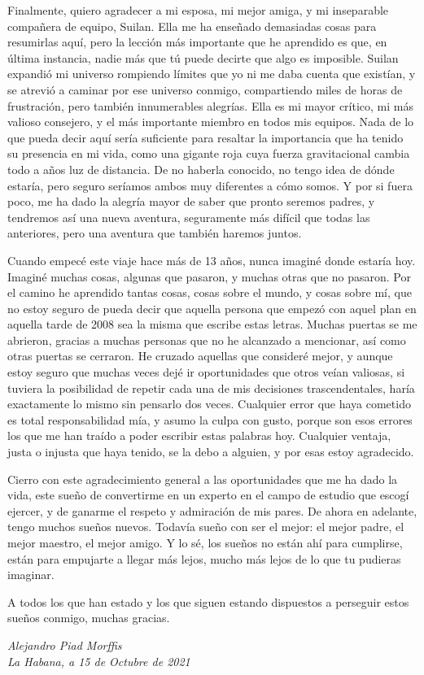 Finalmente, quiero agradecer a mi esposa, mi mejor amiga, y mi inseparable compañera de equipo, Suilan.
Ella me ha enseñado demasiadas cosas para resumirlas aquí, pero la lección más importante que he aprendido es que, en última instancia, nadie más que tú puede decirte que algo es imposible.
Suilan expandió mi universo rompiendo límites que yo ni me daba cuenta que existían, y se atrevió a caminar por ese universo conmigo, compartiendo miles de horas de frustración, pero también innumerables alegrías.
Ella es mi mayor crítico, mi más valioso consejero, y el más importante miembro en todos mis equipos.
Nada de lo que pueda decir aquí sería suficiente para resaltar la importancia que ha tenido su presencia en mi vida, como una gigante roja cuya fuerza gravitacional cambia todo a años luz de distancia.
De no haberla conocido, no tengo idea de dónde estaría, pero seguro seríamos ambos muy diferentes a cómo somos.
Y por si fuera poco, me ha dado la alegría mayor de saber que pronto seremos padres, y tendremos así una nueva aventura, seguramente más difícil que todas las anteriores, pero una aventura que también haremos juntos.

Cuando empecé este viaje hace más de 13 años, nunca imaginé donde estaría hoy.
Imaginé muchas cosas, algunas que pasaron, y muchas otras que no pasaron.
Por el camino he aprendido tantas cosas, cosas sobre el mundo, y cosas sobre mí, que no estoy seguro de pueda decir que aquella persona que empezó con aquel plan en aquella tarde de 2008 sea la misma que escribe estas letras.
Muchas puertas se me abrieron, gracias a muchas personas que no he alcanzado a mencionar, así como otras puertas se cerraron.
He cruzado aquellas que consideré mejor, y aunque estoy seguro que muchas veces dejé ir oportunidades que otros veían valiosas, si tuviera la posibilidad de repetir cada una de mis decisiones trascendentales, haría exactamente lo mismo sin pensarlo dos veces.
Cualquier error que haya cometido es total responsabilidad mía, y asumo la culpa con gusto, porque son esos errores los que me han traído a poder escribir estas palabras hoy.
Cualquier ventaja, justa o injusta que haya tenido, se la debo a alguien, y por esas estoy agradecido.

Cierro con este agradecimiento general a las oportunidades que me ha dado la vida, este sueño de convertirme en un experto en el campo de estudio que escogí ejercer, y de ganarme el respeto y admiración de mis pares.
De ahora en adelante, tengo muchos sueños nuevos.
Todavía sueño con ser el mejor: el mejor padre, el mejor maestro, el mejor amigo.
Y lo sé, los sueños no están ahí para cumplirse, están para empujarte a llegar más lejos, mucho más lejos de lo que tu pudieras imaginar.

A todos los que han estado y los que siguen estando dispuestos a perseguir estos sueños conmigo, muchas gracias.

\vspace{1cm}
\begin{flushright}
{\it Alejandro Piad Morffis}\\
{\it La Habana, a 15 de Octubre de 2021}
\end{flushright}
